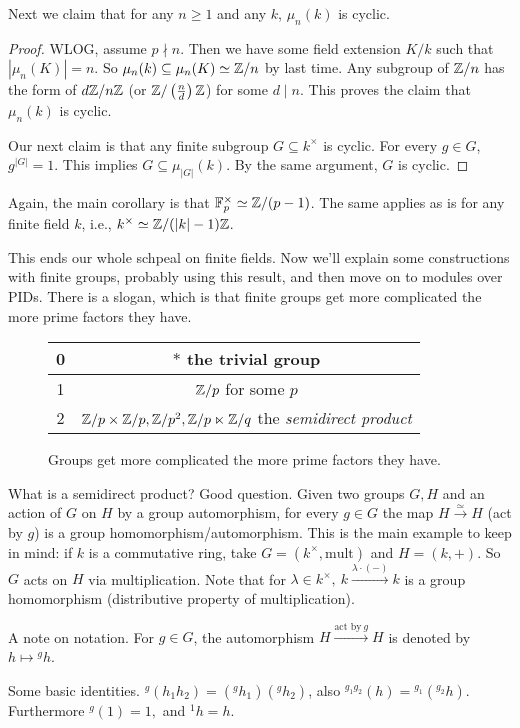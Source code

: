 Next we claim that for any $n \geq 1$ and any $k$,  $\mu_n (k)$ is cyclic.
\begin{proof}
    WLOG, assume $p\nmid n$. Then we have some field extension $K /k$ such that $|\mu _n (K)|=n$. So $\mu _n (k) \subseteq \mu _n (K) \simeq \mathbb{Z} /n$ by last time.  Any subgroup of $\mathbb{Z} /n$ has the form of $d\mathbb{Z} /n\mathbb{Z}$ (or $\mathbb{Z} / \left( \frac{n}{d} \right) \mathbb{Z}$) for some $d \mid n$. This proves the claim that $\mu_n (k)$ is cyclic.

    Our next claim is that any finite subgroup $G \subseteq k^{\times }$ is cyclic. For every $g \in G$, $g ^{|G|}=1$. This implies $G \subseteq \mu_{|G|}(k)$. By the same argument, $G$ is cyclic.
\end{proof}
Again, the main corollary is that $\mathbb{F}_p ^{\times }\simeq  \mathbb{Z} / (p-1)$. The same applies as is for any finite field $k$, i.e., $k ^{\times }\simeq \mathbb{Z} / (|k|-1) \mathbb{Z} $. 

This ends our whole schpeal on finite fields. Now we'll explain some constructions with finite groups, probably using this result, and then move on to modules over PIDs. There is a slogan, which is that finite groups get more complicated the more prime factors they have.

\begin{figure}[H]
   \centering 
   \begin{tabular}{|c|c|} 
       \hline 0 & $* $ the trivial group \\ \hline
       1 & $\mathbb{Z} /p$ for some $p$ \\ \hline
       2 & $\mathbb{Z} / p \times  \mathbb{Z} / p, \mathbb{Z} / p ^2, \mathbb{Z} / p \ltimes \mathbb{Z} /q$ the \emph{semidirect product} \\ \hline
   \end{tabular}
   \label{factorcomp} 
   \caption{Groups get more complicated the more prime factors they have.} 
\end{figure}
What is a semidirect product? Good question. Given two groups $G,H$ and an action of $G$ on $H$ by a group automorphism, for every $g \in G$ the map $H \xrightarrow{\simeq } H$ (act by $g$) is a group homomorphism/automorphism. This is the main example to keep in mind: if $k$ is a commutative ring, take $G = ( k ^{\times }, \text{mult} )$ and $H = (k,+)$. So $G$ acts on $H$ via multiplication. Note that for $\lambda \in  k ^{\times },\ k \xrightarrow{\lambda  \cdot (-)} k$ is a group homomorphism (distributive property of multiplication).
\begin{note}
   A note on notation. For $g \in G$, the automorphism $H \xrightarrow{\text{act by} \ g}  H$ is denoted by $ h \mapsto  {}^gh $. 
\end{note}
Some basic identities. ${}^g (h_1h_2)=({}^gh_1)({}^gh_2)   $, also ${}^{g_1g_2}(h)={}^{g_1}({}^{g_2} h)  $. Furthermore ${}^g(1)=1 , $ and ${}^1h=h . $

